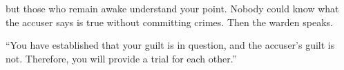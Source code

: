 but those who remain awake understand your point.
Nobody could know what the accuser says is true without committing crimes.
Then the \gls{warden} speaks.

``You have established that your guilt is in question, and the accuser's guilt is not.
Therefore, you will provide a trial for each other.''

